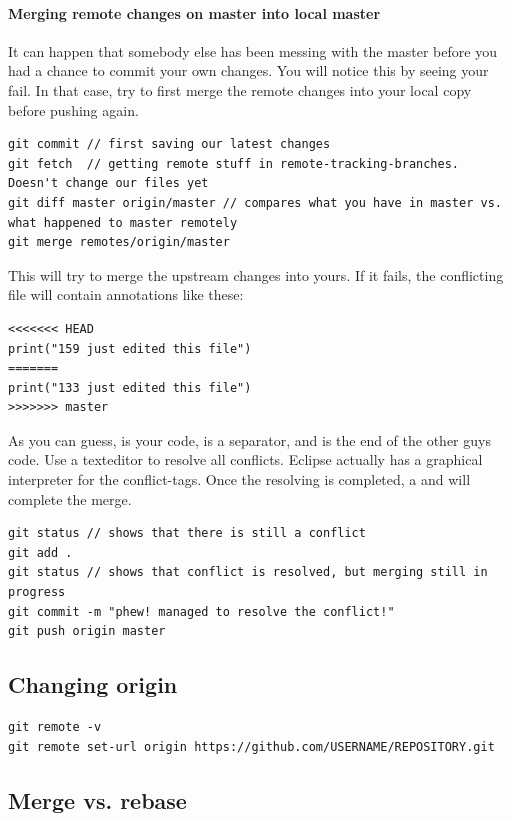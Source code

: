 \paragraph{Merging remote changes on master into local master} It can happen that somebody else has been messing with the master before you had a chance to commit your own changes. You will notice this by seeing your  fail. In that case, try to first merge the remote changes into your local copy before pushing again. 
\begin{lstlisting}
git commit // first saving our latest changes
git fetch  // getting remote stuff in remote-tracking-branches. Doesn't change our files yet
git diff master origin/master // compares what you have in master vs. what happened to master remotely
git merge remotes/origin/master
\end{lstlisting}
This will try to merge the upstream changes into yours. If it fails, the conflicting file will contain annotations like these: 
\begin{lstlisting}
<<<<<<< HEAD
print("159 just edited this file")
=======
print("133 just edited this file")
>>>>>>> master
\end{lstlisting}
As you can guess,  is your code, \inlinecode{===} is a separator, and  is the end of the other guys code. 
Use a texteditor to resolve all conflicts. Eclipse actually has a graphical interpreter for the conflict-tags. Once the resolving is completed, a  and  will complete the merge.
\begin{lstlisting}
git status // shows that there is still a conflict
git add .
git status // shows that conflict is resolved, but merging still in progress
git commit -m "phew! managed to resolve the conflict!"
git push origin master
\end{lstlisting}



\subsection{Changing origin}
\begin{lstlisting}
git remote -v
git remote set-url origin https://github.com/USERNAME/REPOSITORY.git
\end{lstlisting}


\subsection{Merge vs. rebase}


